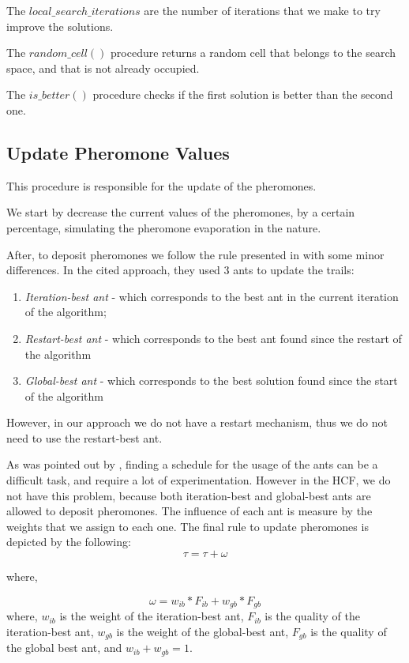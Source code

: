 			The $local\_search\_iterations$ are the number of iterations that we make to try improve the solutions.

			The $random\_cell()$ procedure returns a random cell that belongs to the search space, and that is not already occupied.

			The $is\_better()$ procedure checks if the first solution is better than the second one.
			\subsection{Update Pheromone Values}
			This procedure is responsible for the update of the pheromones. 

			We start by decrease the current values of the pheromones, by a certain percentage, simulating the pheromone evaporation in the nature.

			After, to deposit pheromones we follow the rule presented in \cite{blum04} with some minor differences. In the cited approach, they used 3 ants to update the trails:
			\begin{enumerate}
				\item \emph{Iteration-best ant} - which corresponds to the best ant in the current iteration of the algorithm;
				\item \emph{Restart-best ant} - which corresponds to the best ant found since the restart of the algorithm
				\item \emph{Global-best ant} - which corresponds to the best solution found since the start of the algorithm
			\end{enumerate}
			
			However, in our approach we do not have a restart mechanism, thus we do not need to use the restart-best ant. 

			As was pointed out by \cite{blum04}, finding a schedule for the usage of the ants can be a difficult task, and require a lot of experimentation. However in the HCF, we do not have this problem, because both iteration-best and global-best ants are allowed to deposit pheromones. The influence of each ant is measure by the weights that we assign to each one. The final rule to update pheromones is depicted by the following:
			\begin{equation}
				\tau = \tau + \omega
			\end{equation}
			
			where,
			
			\begin{equation}
				\omega = w_{ib} * F_{ib} + w_{gb} * F_{gb}
			\end{equation}
			where, $w_{ib}$ is the weight of the iteration-best ant, $F_{ib}$ is the quality of the iteration-best ant, $w_{gb}$ is the weight of the global-best ant, $F_{gb}$ is the quality of the global best ant, and $w_{ib} + w_{gb} = 1$.
			
